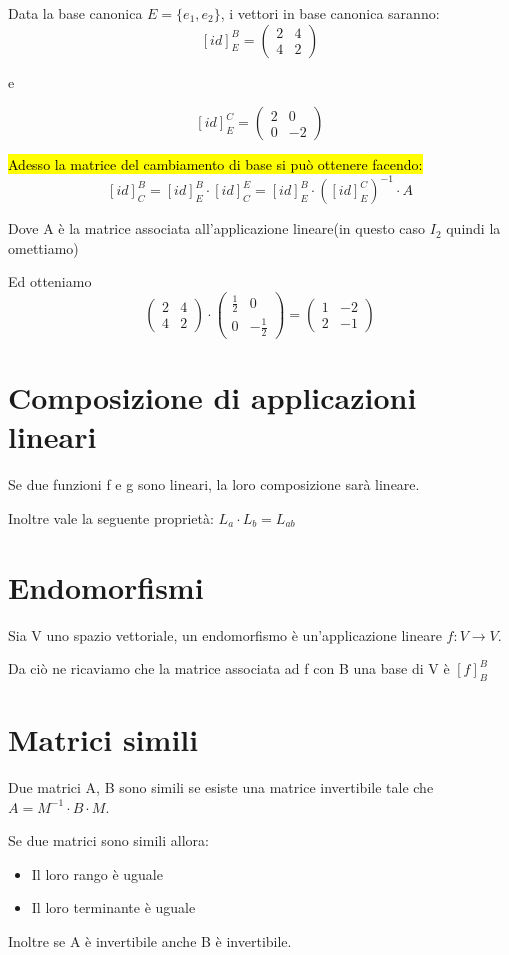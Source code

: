 \documentclass[a4paper, 10pt]{article}
\begin{document}
Data la base canonica $E=\{e_1, e_2\}$, i vettori in base canonica saranno: $$ [id]^B_E=\begin{pmatrix}
2 & 4 \\
4 & 2 
\end{pmatrix}  $$

e 

$$[id]^C_E=\begin{pmatrix}
	2 & 0 \\
	0 & -2 
\end{pmatrix}$$

\hl{Adesso la matrice del cambiamento di base si può ottenere facendo:} $$[id]^B_C=[id]^B_E \cdot [id]^E_C=[id]^B_E \cdot ([id]^C_E)^{-1} \cdot A$$

Dove A è la matrice associata all'applicazione lineare(in questo caso $I_2$ quindi la omettiamo)

Ed otteniamo $$\begin{pmatrix}
	2 & 4 \\
	4 & 2 
\end{pmatrix} \cdot \begin{pmatrix}
\frac{1}{2} & 0 \\
0 & -\frac{1}{2} 
\end{pmatrix} = \begin{pmatrix}
1 & -2 \\
2 & -1 
\end{pmatrix}$$

\section{Composizione di applicazioni lineari}

Se due funzioni f e g sono lineari, la loro composizione sarà lineare.

Inoltre vale la seguente proprietà: $L_a \cdot L_b = L_{ab}$

\section{Endomorfismi}

Sia V uno spazio vettoriale, un endomorfismo è un'applicazione lineare $f: V \rightarrow V$.

Da ciò ne ricaviamo che la matrice associata ad f con B una base di V è $[f]^B_B$

\section{Matrici simili}

Due matrici A, B sono simili se esiste una matrice invertibile tale che $A=M^{-1} \cdot B \cdot M$.

Se due matrici sono simili allora:

\begin{itemize}
	\item Il loro rango è uguale
	\item Il loro terminante è uguale
\end{itemize}

Inoltre se A è invertibile anche B è invertibile.
\end{document}
